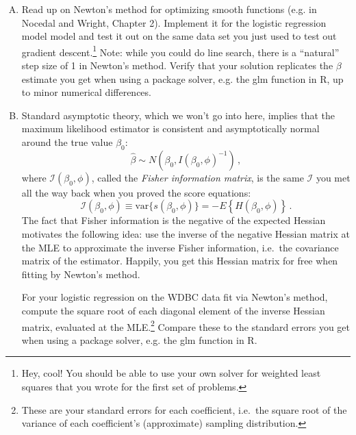 \documentclass{mynotes}
\begin{document}
\begin{enumerate}[(A)]
\item  Read up on Newton's method for optimizing smooth functions (e.g. in Nocedal and Wright, Chapter 2).  Implement it for the logistic regression model model and test it out on the same data set you just used to test out gradient descent.\footnote{Hey, cool!  You should be able to use your own solver for weighted least squares that you wrote for the first set of problems.}  Note: while you could do line search, there is a ``natural'' step size of 1 in Newton's method.  Verify that your solution replicates the $\beta$ estimate you get when using a package solver, e.g. the glm function in R, up to minor numerical differences.  

\item Standard asymptotic theory, which we won't go into here, implies that the maximum likelihood estimator is consistent and asymptotically normal around the true value $\beta_0$:
$$
\hat{\beta} \sim N(\beta_0, I(\beta_0, \phi)^{-1}) \, ,
$$
where $\mathcal{I}(\beta_0, \phi)$, called the \textit{Fisher information matrix}, is the same $\mathcal{I}$ you met all the way back when you proved the score equations:  
$$
\mathcal{I}(\beta_0, \phi) \equiv \mbox{var} \{ s(\beta_0, \phi) \}  = - E \left\{ H(\beta_0, \phi) \right\} \, .
$$
The fact that Fisher information is the negative of the expected Hessian motivates the following idea: use the inverse of the negative Hessian matrix at the MLE to approximate the inverse Fisher information, i.e.~the covariance matrix of the estimator.  Happily, you get this Hessian matrix for free when fitting by Newton's method.

For your logistic regression on the WDBC data fit via Newton's method, compute the square root of each diagonal element of the inverse Hessian matrix, evaluated at the MLE.\footnote{These are your standard errors for each coefficient, i.e.~the square root of the variance of each coefficient's (approximate) sampling distribution.}  Compare these to the standard errors you get when using a package solver, e.g. the glm function in R.  


\end{enumerate}
\end{document}
